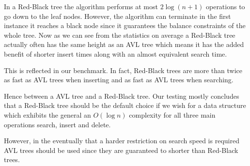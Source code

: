 \documentclass[article]{uom-coursework}
\begin{document}
In a Red-Black tree the algorithm performs at most $2 \log (n + 1)$ operations
to go down to the leaf nodes. However, the algorithm can terminate
in the first instance it reaches a black node since it guarantees
the balance constraints of the whole tree. Now as we can see from the
statistics on average a Red-Black tree actually often has the same height
as an AVL tree which means it has the added benefit of shorter
insert times along with an almost equivalent search time.

This is reflected in our benchmark. In fact, Red-Black trees are
more than twice as fast as AVL trees when inserting and as fast as
AVL trees when searching.

Hence between a AVL tree and a Red-Black tree. 
Our testing mostly concludes that a Red-Black tree should
be the default choice if we wish for a data structure
which exhibits the general an $O(\log n)$ complexity
for all three main operations search, insert and delete.

However, in the eventually that a harder restriction on search speed is required
AVL trees should be used since they are guaranteed to shorter
than Red-Black trees.

\printbibliography
\end{document}

